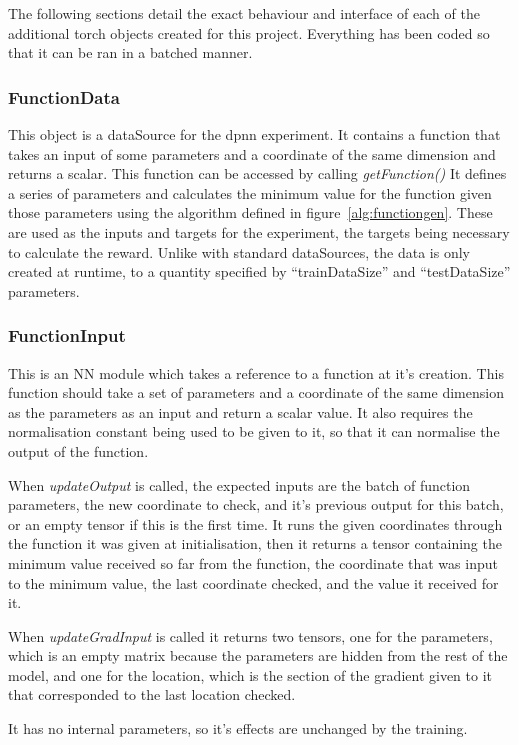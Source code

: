 The following sections detail the exact behaviour and interface of each of the additional torch objects created for this project. Everything has been coded so that it can be ran in a batched manner.

\subsubsection{FunctionData}
This object is a dataSource for the dpnn experiment. It contains a function that takes an input of some parameters and a coordinate of the same dimension and returns a scalar. This function can be accessed by calling \emph{getFunction()} It defines a series of parameters and calculates the minimum value for the function given those parameters using the algorithm defined in figure~\ref{alg:functiongen}. These are used as the inputs and targets for the experiment, the targets being necessary to calculate the reward. Unlike with standard dataSources, the data is only created at runtime, to a quantity specified by ``trainDataSize'' and ``testDataSize'' parameters.

\subsubsection{FunctionInput}
This is an NN module which takes a reference to a function at it's creation. This function should take a set of parameters and a coordinate of the same dimension as the parameters as an input and return a scalar value. It also requires the normalisation constant being used to be given to it, so that it can normalise the output of the function.

 When \emph{updateOutput} is called, the expected inputs are the batch of function parameters, the new coordinate to check, and it's previous output for this batch, or an empty tensor if this is the first time. It runs the given coordinates through the function it was given at initialisation, then it returns a tensor containing the minimum value received so far from the function, the coordinate that was input to the minimum value, the last coordinate checked, and the value it received for it.

When \emph{updateGradInput} is called it returns two tensors, one for the parameters, which is an empty matrix because the parameters are hidden from the rest of the model, and one for the location, which is the section of the gradient given to it that corresponded to the last location checked.

It has no internal parameters, so it's effects are unchanged by the training.
